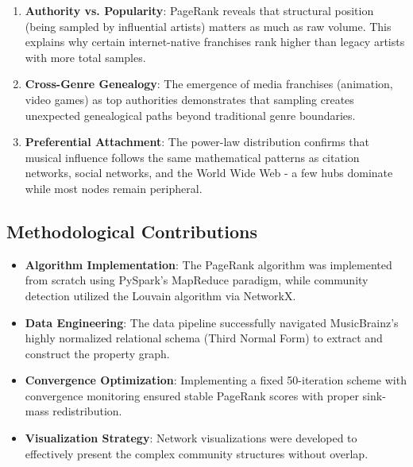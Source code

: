 \documentclass[a4paper, 12pt]{article}
\begin{document}
\begin{enumerate}
    \item \textbf{Authority vs. Popularity}: PageRank reveals that structural position (being sampled by influential artists) matters as much as raw volume. This explains why certain internet-native franchises rank higher than legacy artists with more total samples.
    
    \item \textbf{Cross-Genre Genealogy}: The emergence of media franchises (animation, video games) as top authorities demonstrates that sampling creates unexpected genealogical paths beyond traditional genre boundaries.
    
    \item \textbf{Preferential Attachment}: The power-law distribution confirms that musical influence follows the same mathematical patterns as citation networks, social networks, and the World Wide Web - a few hubs dominate while most nodes remain peripheral.
\end{enumerate}

\subsection{Methodological Contributions}
\begin{itemize}
    \item \textbf{Algorithm Implementation}: The PageRank algorithm was implemented from scratch using PySpark's MapReduce paradigm, while community detection utilized the Louvain algorithm via NetworkX.
    
    \item \textbf{Data Engineering}: The data pipeline successfully navigated MusicBrainz's highly normalized relational schema (Third Normal Form) to extract and construct the property graph.
    
    \item \textbf{Convergence Optimization}: Implementing a fixed 50-iteration scheme with convergence monitoring ensured stable PageRank scores with proper sink-mass redistribution.
    
    \item \textbf{Visualization Strategy}: Network visualizations were developed to effectively present the complex community structures without overlap.
\end{itemize}
\end{document}
